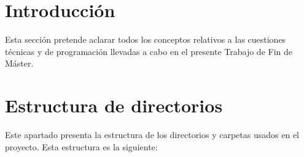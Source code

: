
\section{Introducción}

Esta sección pretende aclarar todos los conceptos relativos a las cuestiones técnicas y de programación llevadas a cabo en el presente Trabajo de Fin de Máster.

\section{Estructura de directorios}
Este apartado presenta la estructura de los directorios y carpetas usados en el proyecto. Esta estructura es la siguiente:

